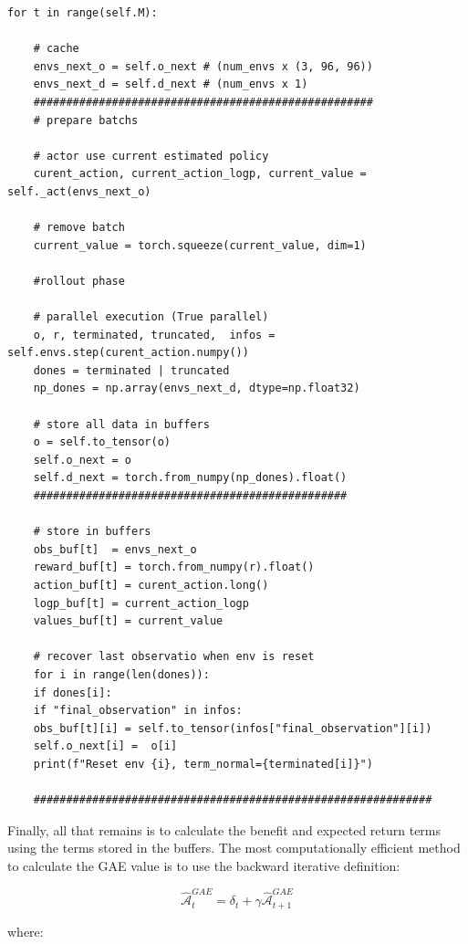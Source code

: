 \documentclass[main.tex]{subfiles}
\begin{document}
\begin{listing}[H]
	\centering
	\caption{Update buffers} 
	\label{codice:rollout_2}
	\begin{verbatim}
for t in range(self.M):
	
	# cache
	envs_next_o = self.o_next # (num_envs x (3, 96, 96))
	envs_next_d = self.d_next # (num_envs x 1)
	####################################################
	# prepare batchs
	
	# actor use current estimated policy
	curent_action, current_action_logp, current_value = self._act(envs_next_o)
	
	# remove batch 
	current_value = torch.squeeze(current_value, dim=1)
	
	#rollout phase
	
	# parallel execution (True parallel)
	o, r, terminated, truncated,  infos = self.envs.step(curent_action.numpy())
	dones = terminated | truncated
	np_dones = np.array(envs_next_d, dtype=np.float32)
	
	# store all data in buffers
	o = self.to_tensor(o)
	self.o_next = o
	self.d_next = torch.from_numpy(np_dones).float()
	################################################
	
	# store in buffers
	obs_buf[t]  = envs_next_o
	reward_buf[t] = torch.from_numpy(r).float()
	action_buf[t] = curent_action.long()
	logp_buf[t] = current_action_logp
	values_buf[t] = current_value
	
	# recover last observatio when env is reset
	for i in range(len(dones)):
	if dones[i]:
	if "final_observation" in infos:
	obs_buf[t][i] = self.to_tensor(infos["final_observation"][i])
	self.o_next[i] =  o[i]
	print(f"Reset env {i}, term_normal={terminated[i]}")
	
	#############################################################
	\end{verbatim}
\end{listing}

Finally, all that remains is to calculate the benefit and expected return terms using the terms stored in the buffers. The most computationally efficient method to calculate the GAE value is to use the backward iterative definition:

\begin{equation}
	\label{GAE}
	\hat{\mathcal{A}}_{t}^{GAE} = \delta_t + \gamma\hat{\mathcal{A}}_{t + 1}^{GAE}
\end{equation}

where:
\end{document}
